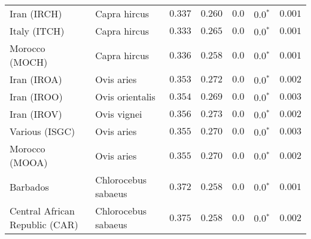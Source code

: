 \begin{center}
\begin{adjustbox}{width = 1\textwidth}
\begin{tabular}{|l|l|r|r|r|r|r|}
                    Iran (IRCH) &         Capra hircus &                                           $ 0.337$ &                                           $ 0.260$ &            $0.0$ &                  $\bm{0.0{^*}}$ &           $ 0.001$ \\
                   Italy (ITCH) &         Capra hircus &                                           $ 0.333$ &                                           $ 0.265$ &            $0.0$ &                  $\bm{0.0{^*}}$ &           $ 0.001$ \\
                 Morocco (MOCH) &         Capra hircus &                                           $ 0.336$ &                                           $ 0.258$ &            $0.0$ &                  $\bm{0.0{^*}}$ &           $ 0.001$ \\
                    Iran (IROA) &           Ovis aries &                                           $ 0.353$ &                                           $ 0.272$ &            $0.0$ &                  $\bm{0.0{^*}}$ &           $ 0.002$ \\
                    Iran (IROO) &      Ovis orientalis &                                           $ 0.354$ &                                           $ 0.269$ &            $0.0$ &                  $\bm{0.0{^*}}$ &           $ 0.003$ \\
                    Iran (IROV) &          Ovis vignei &                                           $ 0.356$ &                                           $ 0.273$ &            $0.0$ &                  $\bm{0.0{^*}}$ &           $ 0.002$ \\
                 Various (ISGC) &           Ovis aries &                                           $ 0.355$ &                                           $ 0.270$ &            $0.0$ &                  $\bm{0.0{^*}}$ &           $ 0.003$ \\
                 Morocco (MOOA) &           Ovis aries &                                           $ 0.355$ &                                           $ 0.270$ &            $0.0$ &                  $\bm{0.0{^*}}$ &           $ 0.002$ \\
                       Barbados &  Chlorocebus sabaeus &                                           $ 0.372$ &                                           $ 0.258$ &            $0.0$ &                  $\bm{0.0{^*}}$ &           $ 0.001$ \\
 Central African Republic (CAR) &  Chlorocebus sabaeus &                                           $ 0.375$ &                                           $ 0.258$ &            $0.0$ &                  $\bm{0.0{^*}}$ &           $ 0.002$ \\

\end{tabular}
\end{adjustbox}
\end{center}
